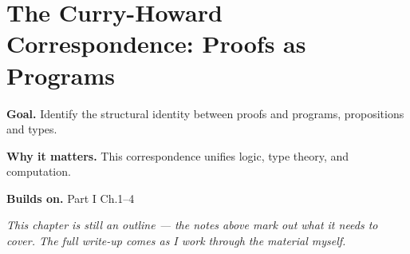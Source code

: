 \chapter{The Curry-Howard Correspondence: Proofs as Programs}
\label{ch:01-mathematical-logic-and-proof-theory-05}

\begin{chapterintro}
\textbf{Goal.} Identify the structural identity between proofs and programs, propositions and types.

\textbf{Why it matters.} This correspondence unifies logic, type theory, and computation.

\textbf{Builds on.} Part I Ch.1–4
\end{chapterintro}

\textit{This chapter is still an outline --- the notes above mark out what it needs to cover. The full write-up comes as I work through the material myself.}
